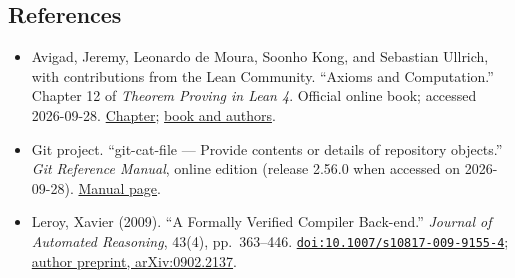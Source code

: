 \documentclass[
  11pt,
]{article}
\providecommand{\tightlist}{%
  \setlength{\itemsep}{0pt}\setlength{\parskip}{0pt}}
\begin{document}
\hypertarget{references}{%
\subsection{References}\label{references}}

\begin{itemize}
\tightlist
\item
  Avigad, Jeremy, Leonardo de Moura, Soonho Kong, and Sebastian Ullrich,
  with contributions from the Lean Community. ``Axioms and
  Computation.'' Chapter 12 of \emph{Theorem Proving in Lean 4}.
  Official online book; accessed 2026-09-28.
  \href{https://lean-lang.org/theorem_proving_in_lean4/Axioms-and-Computation/}{Chapter};
  \href{https://lean-lang.org/theorem_proving_in_lean4/}{book and
  authors}.
\item
  Git project. ``git-cat-file --- Provide contents or details of
  repository objects.'' \emph{Git Reference Manual}, online edition
  (release 2.56.0 when accessed on 2026-09-28).
  \href{https://git-scm.com/docs/git-cat-file}{Manual page}.
\item
  Leroy, Xavier (2009). ``A Formally Verified Compiler Back-end.''
  \emph{Journal of Automated Reasoning}, 43(4), pp.~363--446.
  \href{https://doi.org/10.1007/s10817-009-9155-4}{\nolinkurl{doi:10.1007/s10817-009-9155-4}};
  \href{https://arxiv.org/abs/0902.2137}{author preprint,
  arXiv:0902.2137}.
\end{itemize}
\end{document}
